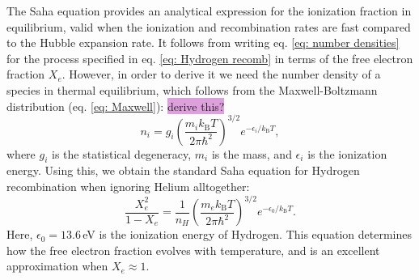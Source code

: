 \documentclass{aa}
\numberwithin{equation}{section}
\numberwithin{table}{section}
\numberwithin{figure}{section}
\begin{document}

The Saha equation provides an analytical expression for the ionization fraction in equilibrium, valid when the ionization and recombination rates are fast compared to the Hubble expansion rate. It follows from writing eq. \eqref{eq: number densities} for the process specified in eq. \eqref{eq: Hydrogen recomb} in terms of the free electron fraction $X_e$. However, in order to derive it we need the number density of a species in thermal equilibrium, which follows from the Maxwell-Boltzmann distribution (eq. \eqref{eq: Maxwell}): \colorbox{Plum}{derive this?}
\begin{equation}
n_i = g_i \left( \frac{m_i k_\text{B} T}{2\pi \hbar^2} \right)^{3/2} e^{-\epsilon_i / k_\text{B} T},
\end{equation}
where $g_i$ is the statistical degeneracy, $m_i$ is the mass, and $\epsilon_i$ is the ionization energy. Using this, we obtain the standard Saha equation for Hydrogen recombination when ignoring Helium alltogether:
\begin{equation}
\frac{X_e^2}{1 - X_e} = \frac{1}{n_H} \left( \frac{m_e k_\text{B} T}{2\pi \hbar^2} \right)^{3/2} e^{-\epsilon_0 / k_\text{B} T}. \label{eq: Saha}
\end{equation}
Here, $\epsilon_0 = 13.6\,$eV is the ionization energy of Hydrogen. This equation determines how the free electron fraction evolves with temperature, and is an excellent approximation when $X_e\approx1$.
\end{document}
